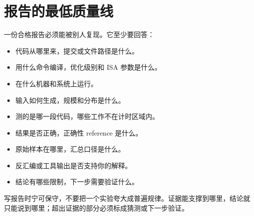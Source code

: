 \section*{报告的最低质量线}

一份合格报告必须能被别人复现。它至少要回答：

\begin{itemize}
  \item 代码从哪里来，提交或文件路径是什么。
  \item 用什么命令编译，优化级别和 ISA 参数是什么。
  \item 在什么机器和系统上运行。
  \item 输入如何生成，规模和分布是什么。
  \item 测的是哪一段代码，哪些工作不在计时区域内。
  \item 结果是否正确，正确性 reference 是什么。
  \item 原始样本在哪里，汇总口径是什么。
  \item 反汇编或工具输出是否支持你的解释。
  \item 结论有哪些限制，下一步需要验证什么。
\end{itemize}

写报告时宁可保守，不要把一个实验夸大成普遍规律。证据能支撑到哪里，结论就只能说到哪里；超出证据的部分必须标成猜测或下一步验证。
